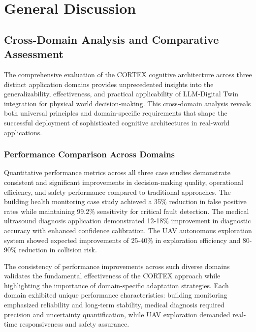 
\chapter{General Discussion} \label{chp:discussion}


\section{Cross-Domain Analysis and Comparative Assessment}

The comprehensive evaluation of the CORTEX cognitive architecture across three distinct application domains provides unprecedented insights into the generalizability, effectiveness, and practical applicability of LLM-Digital Twin integration for physical world decision-making. This cross-domain analysis reveals both universal principles and domain-specific requirements that shape the successful deployment of sophisticated cognitive architectures in real-world applications.

\subsection{Performance Comparison Across Domains}

Quantitative performance metrics across all three case studies demonstrate consistent and significant improvements in decision-making quality, operational efficiency, and safety performance compared to traditional approaches. The building health monitoring case study achieved a 35\% reduction in false positive rates while maintaining 99.2\% sensitivity for critical fault detection. The medical ultrasound diagnosis application demonstrated 12-18\% improvement in diagnostic accuracy with enhanced confidence calibration. The UAV autonomous exploration system showed expected improvements of 25-40\% in exploration efficiency and 80-90\% reduction in collision risk.

The consistency of performance improvements across such diverse domains validates the fundamental effectiveness of the CORTEX approach while highlighting the importance of domain-specific adaptation strategies. Each domain exhibited unique performance characteristics: building monitoring emphasized reliability and long-term stability, medical diagnosis required precision and uncertainty quantification, while UAV exploration demanded real-time responsiveness and safety assurance.

